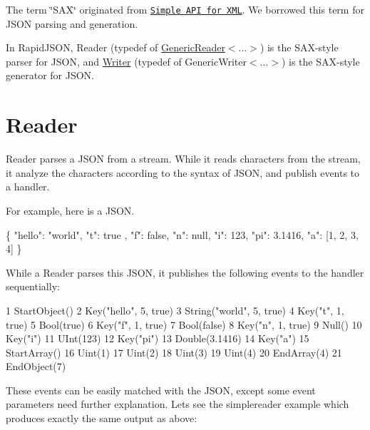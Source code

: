 The term \char`\"{}\+S\+A\+X\char`\"{} originated from \href{http://en.wikipedia.org/wiki/Simple_API_for_XML}{\tt Simple A\+PI for X\+ML}. We borrowed this term for J\+S\+ON parsing and generation.

In Rapid\+J\+S\+ON, {\ttfamily Reader} (typedef of {\ttfamily \hyperlink{class_generic_reader}{Generic\+Reader}$<$...$>$}) is the S\+A\+X-\/style parser for J\+S\+ON, and {\ttfamily \hyperlink{class_writer}{Writer}} (typedef of {\ttfamily Generic\+Writer$<$...$>$}) is the S\+A\+X-\/style generator for J\+S\+ON.\hypertarget{md_Commun_Externe_RapidJSON_doc_sax.zh-cn_Reader}{}\section{Reader}\label{md_Commun_Externe_RapidJSON_doc_sax.zh-cn_Reader}
{\ttfamily Reader} parses a J\+S\+ON from a stream. While it reads characters from the stream, it analyze the characters according to the syntax of J\+S\+ON, and publish events to a handler.

For example, here is a J\+S\+ON.


\begin{DoxyCode}
\{
    \textcolor{stringliteral}{"hello"}: \textcolor{stringliteral}{"world"},
    \textcolor{stringliteral}{"t"}: true ,
    \textcolor{stringliteral}{"f"}: \textcolor{keyword}{false},
    \textcolor{stringliteral}{"n"}: null,
    \textcolor{stringliteral}{"i"}: 123,
    \textcolor{stringliteral}{"pi"}: 3.1416,
    \textcolor{stringliteral}{"a"}: [1, 2, 3, 4]
\}
\end{DoxyCode}


While a {\ttfamily Reader} parses this J\+S\+ON, it publishes the following events to the handler sequentially\+:


\begin{DoxyCode}
1 StartObject()
2 Key("hello", 5, true)
3 String("world", 5, true)
4 Key("t", 1, true)
5 Bool(true)
6 Key("f", 1, true)
7 Bool(false)
8 Key("n", 1, true)
9 Null()
10 Key("i")
11 UInt(123)
12 Key("pi")
13 Double(3.1416)
14 Key("a")
15 StartArray()
16 Uint(1)
17 Uint(2)
18 Uint(3)
19 Uint(4)
20 EndArray(4)
21 EndObject(7)
\end{DoxyCode}


These events can be easily matched with the J\+S\+ON, except some event parameters need further explanation. Let\textquotesingle{}s see the {\ttfamily simplereader} example which produces exactly the same output as above\+:


